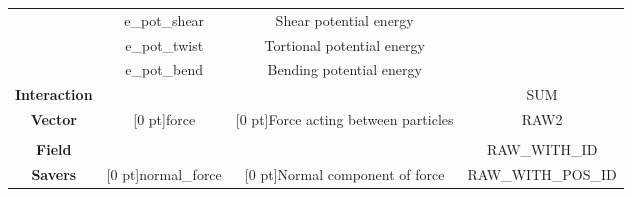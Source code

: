 \begin{table}[h]
\begin{center}
\begin{tabular}{|c|c|c|c|}
  & e\_pot\_shear & Shear potential energy & \\\cline{2-3}
  & e\_pot\_twist & Tortional potential energy & \\\cline{2-3}
  & e\_pot\_bend & Bending potential energy & \\\cline{2-3}
  \hline
  \textbf{Interaction} &  &  & \footnotesize{SUM}\\
  \textbf{Vector} & \raisebox{1 ex}[0 pt]{force} & \raisebox{1 ex}[0 pt]{Force acting between particles} & \footnotesize{RAW2}\\[-0 ex] \cline{2-3}\\[-2.6 ex]
  \textbf{Field} &  &  & \footnotesize{RAW\_WITH\_ID}\\
  \textbf{Savers} & \raisebox{1.5 ex}[0 pt]{normal\_force} & \raisebox{1.5 ex}[0 pt]{Normal component of force} & \footnotesize{RAW\_WITH\_POS\_ID}\\
  \hline
\end{tabular}
\end{center}
\end{table}


